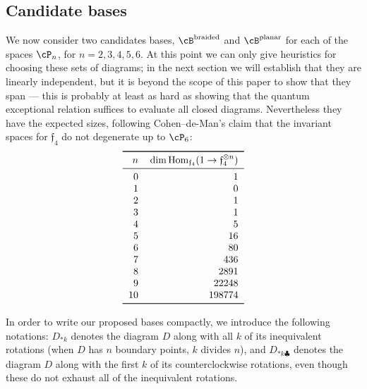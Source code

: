 \documentclass[12pt]{amsart}
\begin{document}
\subsection{Candidate bases}
\label{sec:bases}
We now consider two candidates bases, $\cB^{\text{braided}}$ and $\cB^{\text
{planar}}$ for each of the spaces $\cP_n$, for $n = 2,3,4,5,6$.
At this point we can only give heuristics for choosing these sets of diagrams;
in the next section we will establish that they are linearly independent, but
it is beyond the scope of this paper to show that they span --- this is
probably at least as hard as showing that the quantum exceptional relation
suffices to evaluate all closed diagrams. Nevertheless they have the expected
sizes, following Cohen--de-Man's claim that the invariant spaces for
$\mathfrak{f}_4$ do not degenerate up to $\cP_6$:
\[
\begin{tabular}{rr}
  \toprule
  $n$ & $\dim \Hom_{\mathfrak{f}_4} (1 \to \mathfrak{f}_4^{\otimes n})$ \\
  \midrule
  0 & 1 \\ 1 & 0 \\ 2 & 1 \\ 3 & 1 \\ 4 & 5 \\ 5 & 16 \\
  6 & 80 \\ 7 & 436 \\ 8 & 2891 \\ 9 & 22248 \\ 10 & 198774 \\
  \bottomrule
\end{tabular}
\]

\newcommand{\diagram}[2]{\mathfig{#1}{graphs/urn_sha1_#2.pdf}}

In order to write our proposed bases compactly, we introduce the following
notations: $D_{*k}$ denotes the diagram $D$ along with all $k$ of its
inequivalent rotations (when $D$ has $n$ boundary points, $k$ divides $n$),
and $D_{*k \clubsuit}$ denotes the diagram $D$ along with the first $k$ of its
counterclockwise rotations, even though these do not exhaust all of the
inequivalent rotations.
\end{document}
